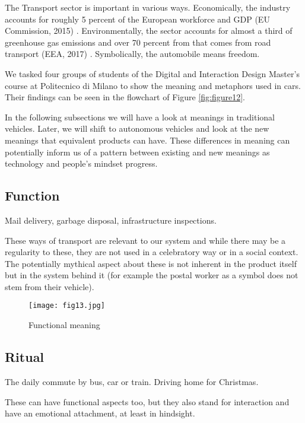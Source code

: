 \documentclass[12pt, usenames, dvipsnames]{report}
\begin{document}
\begin{flushleft}
The Transport sector is important in various ways.
Economically, the industry accounts for roughly 5 percent of the European workforce and GDP (EU Commission, 2015) \cite{eucom2015}.
Environmentally, the sector accounts for almost a third of greenhouse gas emissions and over 70 percent from that comes from road transport (EEA, 2017) \cite{eea2019}. 
Symbolically, the automobile means freedom.

We tasked four groups of students of the Digital and Interaction Design Master's course at Politecnico di Milano to show the meaning and metaphors used in cars.
Their findings can be seen in the flowchart of Figure \ref{fig:figure12}.

In the following subsections we will have a look at meanings in traditional vehicles. Later, we will shift to autonomous vehicles and look at the new meanings that equivalent products can have. These differences in meaning can potentially inform us of a pattern between existing and new meanings as technology and people's mindset progress.

\subsection{Function}

Mail delivery, garbage disposal, infrastructure inspections.

These ways of transport are relevant to our system and while there may be a regularity to these, they are not used in a celebratory way or in a social context. 
The potentially mythical aspect about these is not inherent in the product itself but in the system behind it (for example the postal worker as a symbol does not stem from their vehicle).

\vspace*{1.2em}
\begin{figure}[!htbp]
  \hspace*{5em}
  \texttt{[image: fig13.jpg]}
  \caption{Functional meaning}
  \label{fig:figure13}
\end{figure}
\vspace*{1.2em}

\subsection{Ritual}

The daily commute by bus, car or train.
Driving home for Christmas.

These can have functional aspects too, but they also stand for interaction and have an emotional attachment, at least in hindsight.


\end{flushleft}
\end{document}
